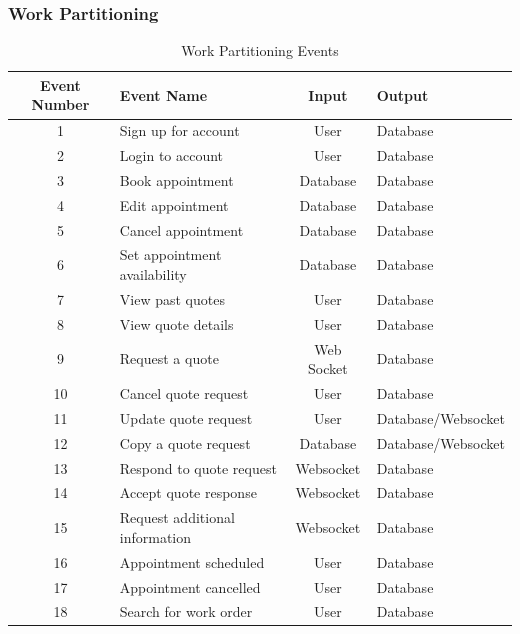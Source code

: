 \documentclass[12pt]{article}
\begin{document}
\newpage
\subsubsection{Work Partitioning}
\begin{table}[H]
	\caption{Work Partitioning Events}
	\centering
	\begin{tabular}{|c|p{3.5cm}|c|p{3.5cm}|}
		\hline
		\textbf{Event Number} & \centering\textbf{Event Name}  & \textbf{Input} & \textbf{Output}    \\
		\hline
		1                     & Sign up for account            & User           & Database           \\
		\hline
		2                     & Login to account               & User           & Database           \\
		\hline
		3                     & Book appointment               & Database       & Database           \\
		\hline
		4                     & Edit appointment               & Database       & Database           \\
		\hline
		5                     & Cancel appointment             & Database       & Database           \\
		\hline
		6                     & Set appointment availability   & Database       & Database           \\
		\hline
		7                     & View past quotes               & User           & Database           \\
		\hline
		8                     & View quote details             & User           & Database           \\
		\hline
		9                     & Request a quote                & Web Socket     & Database           \\
		\hline
		10                    & Cancel quote request           & User           & Database           \\
		\hline
		11                    & Update quote request           & User           & Database/Websocket \\
		\hline
		12                    & Copy a quote request           & Database       & Database/Websocket \\
		\hline
		13                    & Respond to quote request       & Websocket      & Database           \\
		\hline
		14                    & Accept quote response          & Websocket      & Database           \\
		\hline
		15                    & Request additional information & Websocket      & Database           \\
		\hline
		16                    & Appointment scheduled          & User           & Database           \\
		\hline
		17                    & Appointment cancelled          & User           & Database           \\
		\hline
		18                    & Search for work order          & User           & Database           \\
		\hline
	\end{tabular}
\end{table}
\end{document}
